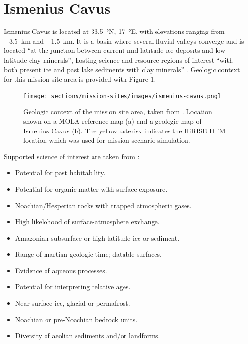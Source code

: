 \clearpage

\section{Ismenius Cavus}
\label{sec:MissionSites:IsmeniusCavus}
Ismenius Cavus is located at \SI{33.5}{\degree}N, \SI{17}{\degree}E, with elevations ranging from \SI{-3.5}{\kilo\meter} and \SI{-1.5}{\kilo\meter}. It is a basin where several fluvial valleys converge and is located ``at the junction between current mid-latitude ice deposits and low latitude clay minerals'', hosting science and resource regions of interest ``with both present ice and past lake sediments with clay minerals''  . Geologic context for this mission site area is provided with Figure \ref{fig:mission-site-ismenius-cavus}.

\begin{figure}[h]
  \centering
  \hypersetup{linkcolor=captionTextColor}
  \texttt{[image: sections/mission-sites/images/ismenius-cavus.png]}\\
  \caption[Geologic context for Ismenius Cavus mission site area]
          {Geologic context of the mission site area, taken from . Location shown on a \ac{MOLA} reference map (a) and a geologic map of Ismenius Cavus (b). The yellow asterisk indicates the \ac{HiRISE} \ac{DTM} location which was used for mission scenario simulation.}
  \label{fig:mission-site-ismenius-cavus}
\end{figure}


Supported science of interest are taken from :
\begin{itemize}
    \item Potential for past habitability.
    \item Potential for organic matter with surface exposure.
    \item Noachian/Hesperian rocks with trapped atmospheric gases.
    \item High likelohood of surface-atmosphere exchange.
    \item Amazonian subsurface or high-latitude ice or sediment.
    \item Range of martian geologic time; datable surfaces.
    \item Evidence of aqueous processes.
    \item Potential for interpreting relative ages.
    \item Near-surface ice, glacial or permafrost.
    \item Noachian or pre-Noachian bedrock units.
    \item Diversity of aeolian sediments and/or landforms.
\end{itemize}


